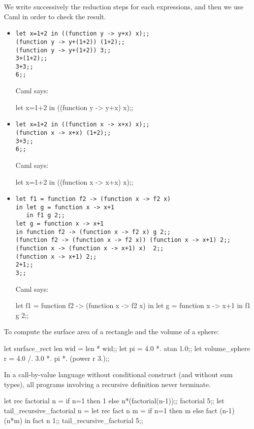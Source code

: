 We write successively the reduction steps for each expressions, and
then we use Caml in order to check the result.
\begin{itemize}
\item
\begin{verbatim}
let x=1+2 in ((function y -> y+x) x);;
(function y -> y+(1+2)) (1+2);;
(function y -> y+(1+2)) 3;;
3+(1+2);;
3+3;;
6;;
\end{verbatim}
Caml says:
\begin{caml_example}
let x=1+2 in ((function y -> y+x) x);;
\end{caml_example}
\item
\begin{verbatim}
let x=1+2 in ((function x -> x+x) x);;
(function x -> x+x) (1+2);;
3+3;;
6;;
\end{verbatim}
Caml says:
\begin{caml_example}
let x=1+2 in ((function x -> x+x) x);;
\end{caml_example}
\item
\begin{verbatim}
let f1 = function f2 -> (function x -> f2 x)
in let g = function x -> x+1
   in f1 g 2;;
let g = function x -> x+1
in function f2 -> (function x -> f2 x) g 2;;
(function f2 -> (function x -> f2 x)) (function x -> x+1) 2;;
(function x -> (function x -> x+1) x)  2;;
(function x -> x+1) 2;;
2+1;;
3;;
\end{verbatim}
Caml says:
\begin{caml_example}
let f1 = function f2 -> (function x -> f2 x)
in let g = function x -> x+1
   in f1 g 2;;
\end{caml_example}
\end{itemize}

 To compute the surface area of a rectangle and the volume
of a sphere:
\begin{caml_example}
let surface_rect len wid = len * wid;;
let pi = 4.0 *. atan 1.0;;
let volume_sphere r = 4.0 /. 3.0 *. pi *. (power r 3.);;
\end{caml_example}

 In a call-by-value language without conditional construct
(and without sum types), all programs involving a recursive definition
never terminate.

\begin{caml_example}
let rec factorial n = if n=1 then 1 else n*(factorial(n-1));;
factorial 5;;
let tail_recursive_factorial n =
  let rec fact n m = if n=1 then m else fact (n-1) (n*m)
  in fact n 1;;
tail_recursive_factorial 5;;
\end{caml_example}

